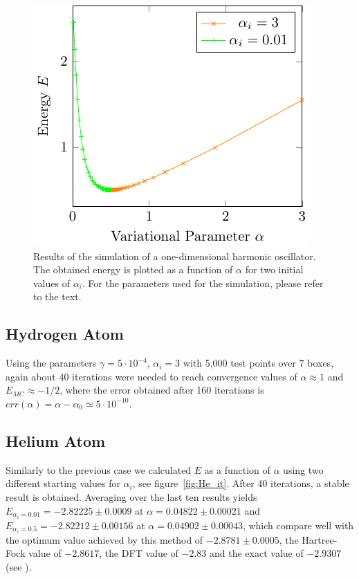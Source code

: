 \begin{figure}[th]
	\begin{center}
		\includegraphics[scale=0.9]{graphs/ho-e-alpha.pdf}
		\caption{
			Results of the simulation of a one-dimensional harmonic oscillator. The obtained energy is plotted as a function of $\alpha$ for two initial values of $\alpha_i$. For the parameters used for the simulation, please refer to the text.
		}
		\label{fig:Ho_rel}
	\end{center}
\end{figure}


\subsection{Hydrogen Atom}
Using the parameters
$\gamma = 5\cdot 10^{-4}$, $\alpha_i = 3 $ with 5,000
test points over $7$ boxes, again about 40 iterations were needed to reach convergence
values of $\alpha \approx 1$ and $E_{MC} \approx - 1/2$, where the error obtained after 160 iterations is
$err(\alpha) = \alpha-\alpha_{0} \simeq 5 \cdot 10^{-10}$. %


\subsection{Helium Atom}
Similarly to the previous case we calculated $E$ as a function of $\alpha$
using two different starting values for $\alpha_i$, see figure~\ref{fig:He_it}.
After 40 iterations, a stable result is obtained. Averaging over the last ten results yields
$E_{\alpha_i = 0.01} = -2.82225\pm 0.0009$ at $\alpha = 0.04822 \pm 0.00021 $ and $E_{\alpha_i = 0.5} =  -2.82212\pm 0.00156$ at $\alpha=0.04902\pm 0.00043$, which
compare well with the optimum value achieved by this method of $-2.8781 \pm 0.0005$, the Hartree-Fock value of $-2.8617$,
the DFT value of $-2.83$ and the exact value of $-2.9307$ (see \cite{JosBook}).

